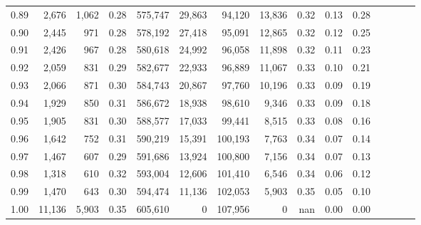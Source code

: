 \begin{tabular}{rrrcrrrrrrrrrrr}
0.89 &   2,676 &  1,062 &                                       0.28 &  575,747 &   29,863 &   94,120 &   13,836 &  0.32 &  0.13 &                         0.28 \\
0.90 &   2,445 &    971 &                                       0.28 &  578,192 &   27,418 &   95,091 &   12,865 &  0.32 &  0.12 &                         0.25 \\
0.91 &   2,426 &    967 &                                       0.28 &  580,618 &   24,992 &   96,058 &   11,898 &  0.32 &  0.11 &                         0.23 \\
0.92 &   2,059 &    831 &                                       0.29 &  582,677 &   22,933 &   96,889 &   11,067 &  0.33 &  0.10 &                         0.21 \\
0.93 &   2,066 &    871 &                                       0.30 &  584,743 &   20,867 &   97,760 &   10,196 &  0.33 &  0.09 &                         0.19 \\
0.94 &   1,929 &    850 &                                       0.31 &  586,672 &   18,938 &   98,610 &    9,346 &  0.33 &  0.09 &                         0.18 \\
0.95 &   1,905 &    831 &                                       0.30 &  588,577 &   17,033 &   99,441 &    8,515 &  0.33 &  0.08 &                         0.16 \\
0.96 &   1,642 &    752 &                                       0.31 &  590,219 &   15,391 &  100,193 &    7,763 &  0.34 &  0.07 &                         0.14 \\
0.97 &   1,467 &    607 &                                       0.29 &  591,686 &   13,924 &  100,800 &    7,156 &  0.34 &  0.07 &                         0.13 \\
0.98 &   1,318 &    610 &                                       0.32 &  593,004 &   12,606 &  101,410 &    6,546 &  0.34 &  0.06 &                         0.12 \\
0.99 &   1,470 &    643 &                                       0.30 &  594,474 &   11,136 &  102,053 &    5,903 &  0.35 &  0.05 &                         0.10 \\
1.00 &  11,136 &  5,903 &                                       0.35 &  605,610 &        0 &  107,956 &        0 &   nan &  0.00 &                         0.00 \\
\bottomrule
\end{tabular}

